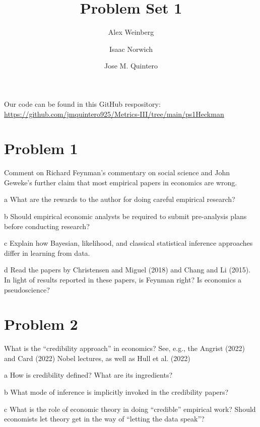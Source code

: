 \documentclass{article}
\title{Problem Set 1}
\author{Alex Weinberg \and Isaac Norwich \and Jose M. Quintero}
\begin{document}
\maketitle

Our code can be found in this GitHub respository: \url{https://github.com/jmquintero925/Metrics-III/tree/main/ps1Heckman}


\section*{Problem 1}
Comment on Richard Feynman’s commentary on social science and John Geweke’s further claim that most empirical papers in economics are wrong.
\begin{problem}{a}
What are the rewards to the author for doing careful empirical research?
\end{problem}
\begin{problem}{b}
Should empirical economic analysts be required to submit pre-analysis
plans before conducting research?
\end{problem}
\begin{problem}{c}
Explain how Bayesian, likelihood, and classical statistical inference approaches differ in learning from data.
\end{problem}
\begin{problem}{d}
 Read the papers by Christensen and Miguel (2018) and Chang and Li (2015). In light of results reported in these papers, is Feynman right? Is economics a pseudoscience?
\end{problem}


\newpage
\section*{Problem 2}
What is the “credibility approach” in economics? See, e.g., the Angrist
(2022) and Card (2022) Nobel lectures, as well as Hull et al. (2022)
\begin{problem}{a}
How is credibility defined? What are its ingredients?
\end{problem}
\begin{problem}{b}
What mode of inference is implicitly invoked in the credibility papers?
\end{problem}
\begin{problem}{c}
What is the role of economic theory in doing “credible” empirical work? Should economists let theory get in the way of “letting the data speak”?
\end{problem}
\end{document}
